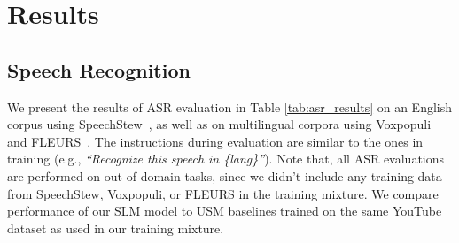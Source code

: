 
\section{Results}
\label{sec:results}

\subsection{Speech Recognition}
\label{sec:asr_results}

We present the results of ASR evaluation in Table \ref{tab:asr_results} on an English corpus using SpeechStew~\cite{chan2021speechstew}, as well as on multilingual corpora using Voxpopuli~\cite{wang2021voxpopuli} and FLEURS~\cite{conneau2023fleurs}. The instructions during evaluation are similar to the ones in training (e.g., {\em ``Recognize this speech in \{lang\}''}). Note that, all ASR evaluations are performed on out-of-domain tasks, since we didn't include any training data from SpeechStew, Voxpopuli, or FLEURS in the training mixture. We compare performance of our SLM model to USM baselines\cite{zhang2023google} trained on the same YouTube dataset as used in our training mixture. 

